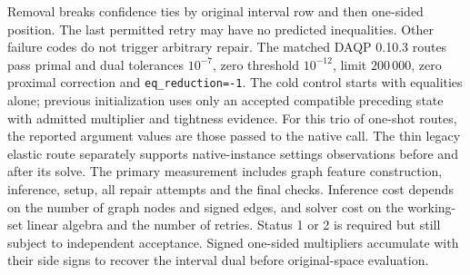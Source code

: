 Removal breaks confidence ties by original interval row and then
one-sided position. The last permitted retry may have no
predicted inequalities. Other failure codes do not trigger arbitrary
repair. The matched DAQP 0.10.3 routes pass primal and dual tolerances
\(10^{-7}\), zero threshold \(10^{-12}\), limit \(200\,000\),
zero proximal correction and \texttt{eq\_reduction=-1}.
The cold control starts with equalities alone; previous initialization
uses only an accepted compatible preceding state with admitted
multiplier and tightness evidence. For this trio of one-shot routes,
the reported argument values are those passed to the native call.
The thin legacy elastic route separately supports native-instance
settings observations before and after its solve. The primary
measurement includes graph feature construction, inference, setup,
all repair attempts and the final checks. Inference cost depends on
the number of graph nodes and signed edges, and solver cost on the
working-set linear algebra and the number of retries. Status 1 or 2
is required but still subject to independent acceptance. Signed
one-sided multipliers accumulate with their side signs to recover
the interval dual before original-space evaluation.
